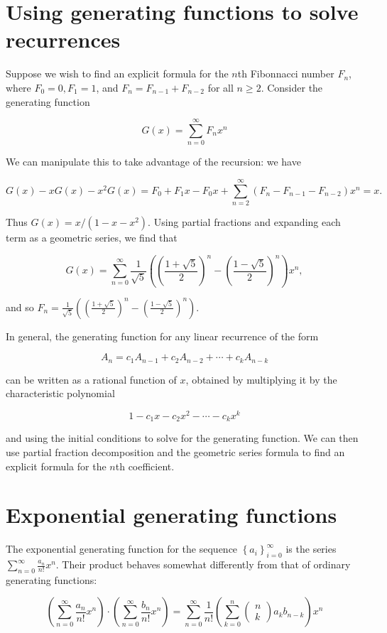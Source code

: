 \documentclass[12pt]{exam}
\begin{document}
\section{Using generating functions to solve recurrences}

Suppose we wish to find an explicit formula for the $n$th Fibonnacci number $F_{n}$, where $F_{0}=0, F_{1}=1$, and $F_{n}=F_{n-1}+F_{n-2}$ for all $n \geq 2$. Consider the generating function

$$
G(x)=\sum_{n=0}^{\infty} F_{n} x^{n}
$$

We can manipulate this to take advantage of the recursion: we have

$$
G(x)-x G(x)-x^{2} G(x)=F_{0}+F_{1} x-F_{0} x+\sum_{n=2}^{\infty}\left(F_{n}-F_{n-1}-F_{n-2}\right) x^{n}=x .
$$

Thus $G(x)=x /\left(1-x-x^{2}\right)$. Using partial fractions and expanding each term as a geometric series, we find that

$$
G(x)=\sum_{n=0}^{\infty} \frac{1}{\sqrt{5}}\left(\left(\frac{1+\sqrt{5}}{2}\right)^{n}-\left(\frac{1-\sqrt{5}}{2}\right)^{n}\right) x^{n},
$$

and so $F_{n}=\frac{1}{\sqrt{5}}\left(\left(\frac{1+\sqrt{5}}{2}\right)^{n}-\left(\frac{1-\sqrt{5}}{2}\right)^{n}\right)$.

In general, the generating function for any linear recurrence of the form

$$
A_{n}=c_{1} A_{n-1}+c_{2} A_{n-2}+\cdots+c_{k} A_{n-k}
$$

can be written as a rational function of $x$, obtained by multiplying it by the characteristic polynomial

$$
1-c_{1} x-c_{2} x^{2}-\cdots-c_{k} x^{k}
$$

and using the initial conditions to solve for the generating function. We can then use partial fraction decomposition and the geometric series formula to find an explicit formula for the $n$th coefficient. 

\section{Exponential generating functions}

The exponential generating function for the sequence $\left\{a_{i}\right\}_{i=0}^{\infty}$ is the series $\sum_{n=0}^{\infty} \frac{a_{n}}{n !} x^{n}$. Their product behaves somewhat differently from that of ordinary generating functions:

$$
\left(\sum_{n=0}^{\infty} \frac{a_{n}}{n !} x^{n}\right) \cdot\left(\sum_{n=0}^{\infty} \frac{b_{n}}{n !} x^{n}\right)=\sum_{n=0}^{\infty} \frac{1}{n !}\left(\sum_{k=0}^{n}\left(\begin{array}{l}
n \\
k
\end{array}\right) a_{k} b_{n-k}\right) x^{n}
$$
\end{document}
